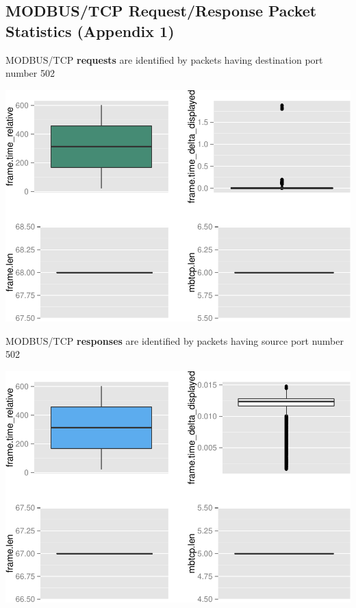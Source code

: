 \documentclass[]{article}
\begin{document}
\pagebreak

\subsection{MODBUS/TCP Request/Response Packet Statistics (Appendix
1)}\label{modbustcp-requestresponse-packet-statistics-appendix-1}

MODBUS/TCP \textbf{requests} are identified by packets having
destination port number 502

\begin{center}\includegraphics{sew_files/figure-latex/unnamed-chunk-16-1} \end{center}

\pagebreak

MODBUS/TCP \textbf{responses} are identified by packets having source
port number 502

\begin{center}\includegraphics{sew_files/figure-latex/unnamed-chunk-18-1} \end{center}
\end{document}
